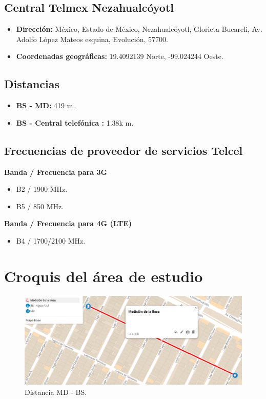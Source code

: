 \documentclass[11pt,letterpaper]{article}
\begin{document}
\newpage
\subsection{Central Telmex Nezahualcóyotl}
\begin{itemize}
    \item \textbf{Dirección: }México, Estado de México, Nezahualcóyotl, Glorieta Bucareli, 
    Av. Adolfo López Mateos esquina, Evolución, 57700.
    \item \textbf{Coordenadas geográficas: }19.4092139 Norte, -99.024244 Oeste.
\end{itemize}

\subsection{Distancias}
\begin{itemize}
     \item \textbf{BS - MD: } 419 m.
     \item \textbf{BS - Central telefónica : } 1.38k m.
\end{itemize}

\subsection{Frecuencias de proveedor de servicios Telcel}
\textbf{Banda / Frecuencia para 3G}
\begin{itemize}
     \item B2 / 1900 MHz.
     \item B5 / 850 MHz.
\end{itemize}

\textbf{Banda / Frecuencia para 4G (LTE)}
\begin{itemize}
     \item B4 / 1700/2100 MHz.
\end{itemize}
    
\newpage
\section{Croquis del área de estudio}
\begin{figure}[ht]
    \centering
    \includegraphics[width=.9\textwidth, angle=90]{imagenes/t13.png}
    \caption{Distancia MD - BS.}
\end{figure}
\end{document}
